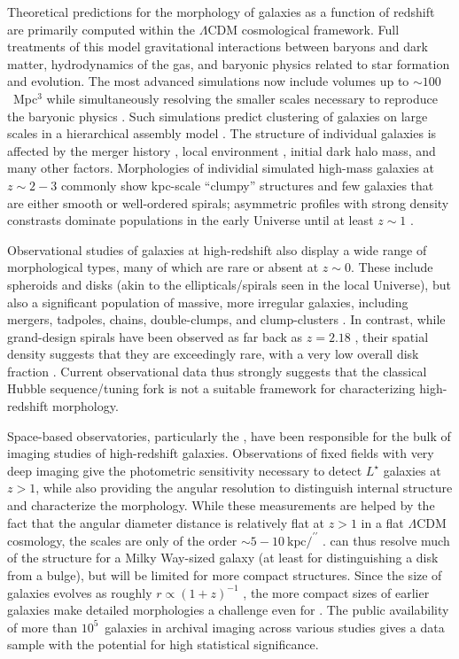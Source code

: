 \documentclass[twocolumn]{aastex6}
\begin{document}
Theoretical predictions for the morphology of galaxies as a function of redshift are primarily computed within the $\Lambda$CDM cosmological framework. Full treatments of this model gravitational interactions between baryons and dark matter, hydrodynamics of the gas, and baryonic physics related to star formation and evolution. The most advanced simulations now include volumes up to $\sim100$~Mpc$^3$ while simultaneously resolving the smaller scales necessary to reproduce the baryonic physics \citep{vog14a,sch15}. Such simulations predict clustering of galaxies on large scales in a hierarchical assembly model \citep{sil12}. The structure of individual galaxies is affected by the merger history \citep{too72,hop10}, local environment \citep[such as the morphology-density relation;][]{dre80}, initial dark halo mass, and many other factors. Morphologies of individial simulated high-mass galaxies at $z\sim2-3$ commonly show kpc-scale ``clumpy'' structures and few galaxies that are either smooth or well-ordered spirals; asymmetric profiles with strong density constrasts dominate populations in the early Universe until at least $z\sim1$ \citep{gen14}. 

Observational studies of galaxies at high-redshift also display a wide range of morphological types, many of which are rare or absent at $z\sim0$. These include spheroids and disks (akin to the ellipticals/spirals seen in the local Universe), but also a significant population of massive, more irregular galaxies, including mergers, tadpoles, chains, double-clumps, and clump-clusters \citep{elm05,elm07,cam11a,for11a,kar15}. In contrast, while grand-design spirals have been observed as far back as $z=2.18$ \citep{law12}, their spatial density suggests that they are exceedingly rare, with a very low overall disk fraction \citep{mor13}. Current observational data thus strongly suggests that the classical Hubble sequence/tuning fork \citep{hub36} is not a suitable framework for characterizing high-redshift morphology. 

Space-based observatories, particularly the \hubble, have been responsible for the bulk of imaging studies of high-redshift galaxies. Observations of fixed fields with very deep imaging \citep[eg,][]{wil96,gia04,bec06,dav07,sco07,gro11} give the photometric sensitivity necessary to detect $L^\star$ galaxies at $z>1$, while also providing the angular resolution to distinguish internal structure and characterize the morphology. While these measurements are helped by the fact that the angular diameter distance is relatively flat at $z>1$ in a flat $\Lambda$CDM cosmology, the scales are only of the order $\sim5-10~\mathrm{kpc}/^{\prime\prime}$ \citep{wri06}. \hst{} can thus resolve much of the structure for a Milky Way-sized galaxy (at least for distinguishing a disk from a bulge), but will be limited for more compact structures. Since the size of galaxies evolves as roughly $r\propto(1+z)^{-1}$ \citep{law12a}, the more compact sizes of earlier galaxies make detailed morphologies a challenge even for \hst{} \citep{che12}. The public availability of more than $10^5$~galaxies in archival imaging across various studies gives a data sample with the potential for high statistical significance. 
\end{document}
